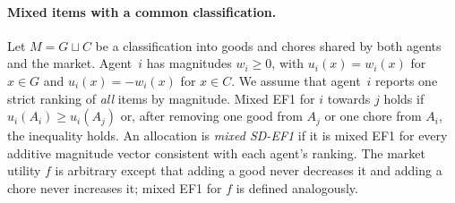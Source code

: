 \documentclass[11pt]{article}
\theoremstyle{definition}
\begin{document}
\paragraph{Mixed items with a common classification.}
Let $M=G\sqcup C$ be a classification into goods and chores shared by both agents and the market. Agent~$i$ has magnitudes $w_i\ge0$, with $u_i(x)=w_i(x)$ for $x\in G$ and $u_i(x)=-w_i(x)$ for $x\in C$. We assume that agent~$i$ reports one strict ranking of \emph{all} items by magnitude. Mixed EF1 for $i$ towards $j$ holds if $u_i(A_i)\ge u_i(A_j)$ or, after removing one good from $A_j$ or one chore from $A_i$, the inequality holds. An allocation is \emph{mixed SD-EF1} if it is mixed EF1 for every additive magnitude vector consistent with each agent's ranking. The market utility $f$ is arbitrary except that adding a good never decreases it and adding a chore never increases it; mixed EF1 for $f$ is defined analogously.
\end{document}
